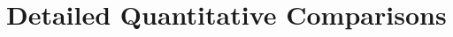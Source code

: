 \appendix
\setcounter{secnumdepth}{1}























\section{Detailed Quantitative Comparisons}
\label{app:detailed_quantitative_comparisons}

